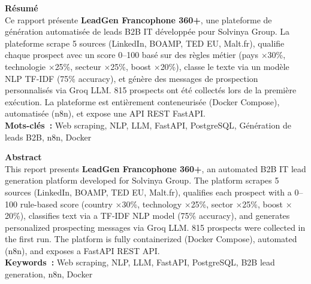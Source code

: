 \thispagestyle{empty}

\vspace*{\fill}

\begin{center}
  \begin{tcolorbox}[
    colback=lightBlue!20, colframe=espritBlue,
    boxrule=1pt, arc=6pt,
    left=20pt, right=20pt, top=16pt, bottom=16pt,
    width=0.88\textwidth
  ]
    \centering
    {\Large\bfseries\color{espritBlue} Résumé} \\[10pt]
    \small
    Ce rapport présente \textbf{LeadGen Francophone 360+}, une plateforme de
    génération automatisée de leads B2B IT développée pour Solvinya Group.
    La plateforme scrape 5 sources (LinkedIn, BOAMP, TED EU, Malt.fr), qualifie
    chaque prospect avec un score 0--100 basé sur des règles métier
    (pays $\times$30\%, technologie $\times$25\%, secteur $\times$25\%,
    boost $\times$20\%), classe le texte via un modèle NLP TF-IDF (75\% accuracy),
    et génère des messages de prospection personnalisés via Groq LLM. 815 prospects
    ont été collectés lors de la première exécution. La plateforme est entièrement
    conteneurisée (Docker Compose), automatisée (n8n), et expose une API REST
    FastAPI. \\[8pt]
    \textbf{Mots-clés~:} Web scraping, NLP, LLM, FastAPI, PostgreSQL,
    Génération de leads B2B, n8n, Docker
  \end{tcolorbox}

  \vspace{0.8cm}

  \begin{tcolorbox}[
    colback=lightAmber!20, colframe=espritRed!60,
    boxrule=1pt, arc=6pt,
    left=20pt, right=20pt, top=16pt, bottom=16pt,
    width=0.88\textwidth
  ]
    \centering
    {\Large\bfseries\color{espritRed} Abstract} \\[10pt]
    \small
    This report presents \textbf{LeadGen Francophone 360+}, an automated B2B IT
    lead generation platform developed for Solvinya Group. The platform scrapes
    5 sources (LinkedIn, BOAMP, TED EU, Malt.fr), qualifies each prospect with a
    0--100 rule-based score (country $\times$30\%, technology $\times$25\%,
    sector $\times$25\%, boost $\times$20\%), classifies text via a TF-IDF NLP
    model (75\% accuracy), and generates personalized prospecting messages via Groq
    LLM. 815 prospects were collected in the first run. The platform is fully
    containerized (Docker Compose), automated (n8n), and exposes a FastAPI REST
    API. \\[8pt]
    \textbf{Keywords~:} Web scraping, NLP, LLM, FastAPI, PostgreSQL,
    B2B lead generation, n8n, Docker
  \end{tcolorbox}
\end{center}

\vspace*{\fill}

